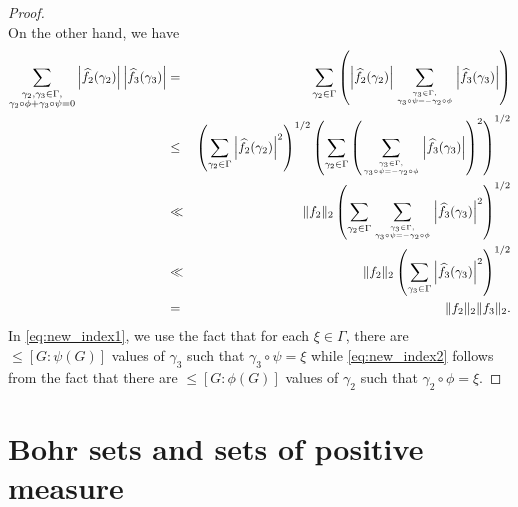 \documentclass[10pt]{article}
\theoremstyle{definition}
\begin{document}
\begin{proof}
\begin{equation*}
\end{equation*}
On the other hand, we have
\begin{eqnarray}
\sum_{\substack{\gamma_2, \gamma_3 \in \Gamma, \\ \gamma_2 \circ \phi + \gamma_3 \circ \psi = 0}} \left| \widehat{f_2}(\gamma_2) \right| \left| \widehat{f_3}(\gamma_3) \right| &=& \sum_{\gamma_2 \in \Gamma} \left( \left| \widehat{f_2}(\gamma_2) \right| \sum_{\gamma_3 \in \Gamma, \atop{\gamma_3 \circ \psi = - \gamma_2 \circ \phi}} \left| \widehat{f_3}(\gamma_3) \right|\right) \nonumber\\
&\leq& \left( \sum_{\gamma_2 \in \Gamma} \left| \widehat{f_2}(\gamma_2) \right|^2 \right)^{1/2} \left( \sum_{\gamma_2 \in \Gamma} \left( \sum_{\gamma_3 \in \Gamma, \atop{\gamma_3 \circ \psi = - \gamma_2 \circ \phi}} \left| \widehat{f_3}(\gamma_3) \right| \right)^2 \right)^{1/2} \nonumber \\
&\ll& \lVert f_2 \rVert_2 \left( \sum_{\gamma_2 \in \Gamma} \sum_{\gamma_3 \in \Gamma,\atop{\gamma_3 \circ \psi = - \gamma_2 \circ \phi}} \left|  \widehat{f_3}(\gamma_3) \right|^2 \right)^{1/2} \label{eq:new_index1} \\
&\ll& \lVert f_2 \rVert_2 \left( \sum_{\gamma_3 \in \Gamma} \left| \widehat{f_3}(\gamma_3) \right|^2 \right)^{1/2} \label{eq:new_index2} \\
&=& \lVert f_2 \rVert_2 \lVert f_3 \rVert_2. \nonumber
\end{eqnarray}
In \eqref{eq:new_index1}, we use the fact that for each $\xi \in \Gamma$, there are $\leq [G: \psi(G)]$ values of $\gamma_3$ such that $\gamma_3 \circ \psi = \xi$ while \eqref{eq:new_index2} follows from the fact that there are $\leq [G: \phi(G)]$ values of $\gamma_2$ such that $\gamma_2 \circ \phi = \xi$.
\end{proof}
\setcounter{section}{3}\setcounter{equation}{14}
\section{Bohr sets and sets of positive measure}
\label{sec:density}
\end{document}
